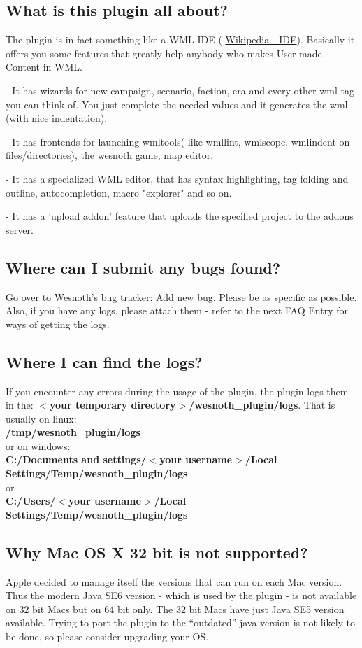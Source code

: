 \documentclass[10pt]{article}
\begin{document}
\subsection{What is this plugin all about?}
The plugin is in fact something like a WML IDE ( \href{http://en.wikipedia.org/wiki/Integrated_development_environment}{Wikipedia - IDE}). Basically it offers you some features that greatly help anybody who makes User made Content in WML.
\begin{description}
\item- It has wizards for new campaign, scenario, faction, era and every other wml tag you can think of. You just complete the needed values and it generates the wml (with nice indentation).
\item- It has frontends for launching wmltools( like wmllint, wmlscope, wmlindent on files/directories), the wesnoth game, map editor.
\item- It has a specialized WML editor, that has syntax highlighting, tag folding and outline, autocompletion, macro "explorer" and so on.
\item- It has a 'upload addon' feature that uploads the specified project to the addons server.
\end{description}

\subsection{Where can I submit any bugs found?}
Go over to Wesnoth's bug tracker: \href{https://gna.org/bugs/?func=additem&group=wesnoth&bug_group_id=116}{Add new bug}. Please be as specific as possible. Also, if you have any logs, please attach them - refer to the next FAQ Entry for ways of getting the logs.

\subsection{Where I can find the logs?}
If you encounter any errors during the usage of the plugin, the plugin logs them in the: \textbf{$<$your temporary directory$>$/wesnoth\_plugin/logs}.
That is usually on linux:\\
\indent \textbf{/tmp/wesnoth\_plugin/logs}\\
or on windows:\\
\indent \textbf{C:/Documents and settings/$<$your username$>$/Local Settings/Temp/wesnoth\_plugin/logs} \\
or\\
\indent \textbf{C:/Users/$<$your username$>$/Local Settings/Temp/wesnoth\_plugin/logs}

\subsection{Why Mac OS X 32 bit is not supported?}
Apple decided to manage itself the versions that can run on each Mac version. Thus the modern Java SE6 version - which is used by the plugin - is not available on 32 bit Macs but on 64 bit only. The 32 bit Macs have just Java SE5 version available. Trying to port the plugin to the ``outdated'' java version is not likely to be done, so please consider upgrading your OS.
\end{document}
